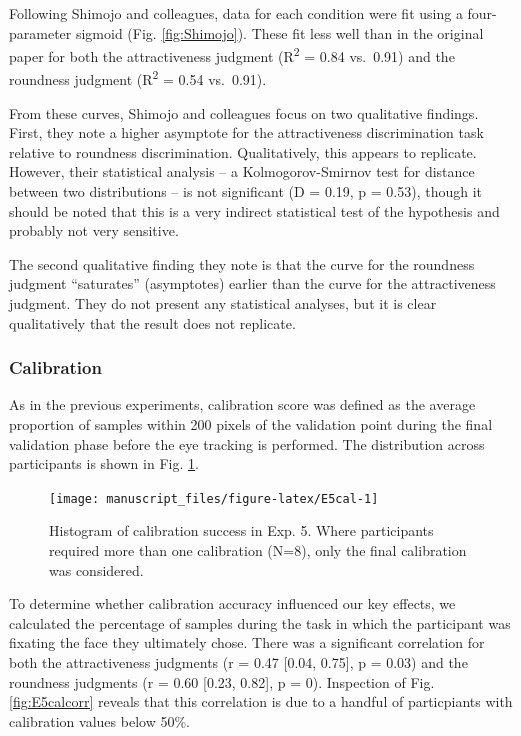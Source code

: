 \documentclass[
  man,floatsintext]{apa6}
\begin{document}
Following Shimojo and colleagues, data for each condition were fit using a four-parameter sigmoid (Fig. \ref{fig:Shimojo}). These fit less well than in the original paper for both the attractiveness judgment (R\textsuperscript{2} = 0.84 vs.~0.91) and the roundness judgment (R\textsuperscript{2} = 0.54 vs.~0.91).

From these curves, Shimojo and colleagues focus on two qualitative findings. First, they note a higher asymptote for the attractiveness discrimination task relative to roundness discrimination. Qualitatively, this appears to replicate. However, their statistical analysis -- a Kolmogorov-Smirnov test for distance between two distributions -- is not significant (D = 0.19, p = 0.53), though it should be noted that this is a very indirect statistical test of the hypothesis and probably not very sensitive.

The second qualitative finding they note is that the curve for the roundness judgment ``saturates'' (asymptotes) earlier than the curve for the attractiveness judgment. They do not present any statistical analyses, but it is clear qualitatively that the result does not replicate.

\hypertarget{calibration-4}{%
\subsubsection{Calibration}\label{calibration-4}}

As in the previous experiments, calibration score was defined as the average proportion of samples within 200 pixels of the validation point during the final validation phase before the eye tracking is performed. The distribution across participants is shown in Fig. \ref{fig:E5cal}.


\begin{figure}
\texttt{[image: manuscript\_files/figure-latex/E5cal-1]} \caption{Histogram of calibration success in Exp. 5. Where participants required more than one calibration (N=8), only the final calibration was considered.}\label{fig:E5cal}
\end{figure}

To determine whether calibration accuracy influenced our key effects, we calculated the percentage of samples during the task in which the participant was fixating the face they ultimately chose. There was a significant correlation for both the attractiveness judgments (r = 0.47 {[}0.04, 0.75{]}, p = 0.03) and the roundness judgments (r = 0.60 {[}0.23, 0.82{]}, p = 0). Inspection of Fig. \ref{fig:E5calcorr} reveals that this correlation is due to a handful of particpiants with calibration values below 50\%.
\end{document}
